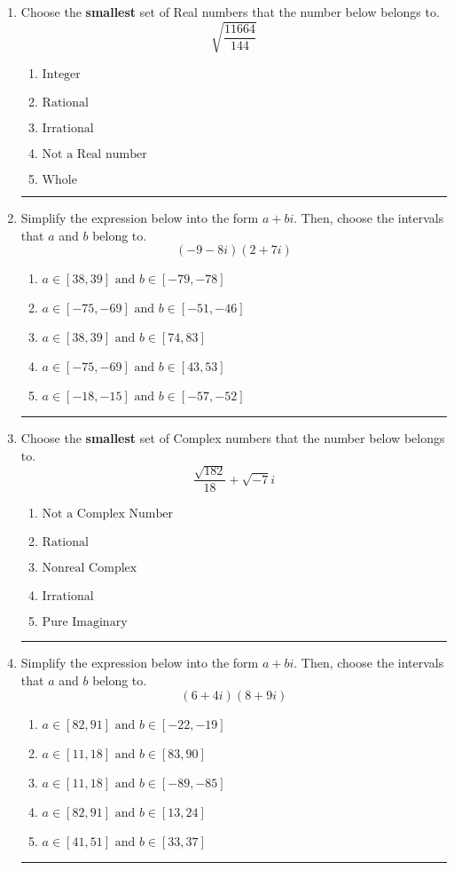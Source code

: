 \documentclass[14pt]{extbook}
\newcommand{\litem}[1]{\item#1\hspace*{-1cm}\rule{\textwidth}{0.4pt}}
\begin{document}
\begin{enumerate}
{\begin{enumerate}[label=\Alph*.]
\end{enumerate} }
\litem{
Choose the \textbf{smallest} set of Real numbers that the number below belongs to.\[ \sqrt{\frac{11664}{144}} \]\begin{enumerate}[label=\Alph*.]
\item \( \text{Integer} \)
\item \( \text{Rational} \)
\item \( \text{Irrational} \)
\item \( \text{Not a Real number} \)
\item \( \text{Whole} \)

\end{enumerate} }
\litem{
Simplify the expression below into the form $a+bi$. Then, choose the intervals that $a$ and $b$ belong to.\[ (-9 - 8 i)(2 + 7 i) \]\begin{enumerate}[label=\Alph*.]
\item \( a \in [38, 39] \text{ and } b \in [-79, -78] \)
\item \( a \in [-75, -69] \text{ and } b \in [-51, -46] \)
\item \( a \in [38, 39] \text{ and } b \in [74, 83] \)
\item \( a \in [-75, -69] \text{ and } b \in [43, 53] \)
\item \( a \in [-18, -15] \text{ and } b \in [-57, -52] \)

\end{enumerate} }
\litem{
Choose the \textbf{smallest} set of Complex numbers that the number below belongs to.\[ \frac{\sqrt{182}}{18}+\sqrt{-7}i \]\begin{enumerate}[label=\Alph*.]
\item \( \text{Not a Complex Number} \)
\item \( \text{Rational} \)
\item \( \text{Nonreal Complex} \)
\item \( \text{Irrational} \)
\item \( \text{Pure Imaginary} \)

\end{enumerate} }
\litem{
Simplify the expression below into the form $a+bi$. Then, choose the intervals that $a$ and $b$ belong to.\[ (6 + 4 i)(8 + 9 i) \]\begin{enumerate}[label=\Alph*.]
\item \( a \in [82, 91] \text{ and } b \in [-22, -19] \)
\item \( a \in [11, 18] \text{ and } b \in [83, 90] \)
\item \( a \in [11, 18] \text{ and } b \in [-89, -85] \)
\item \( a \in [82, 91] \text{ and } b \in [13, 24] \)
\item \( a \in [41, 51] \text{ and } b \in [33, 37] \)


\end{enumerate}}
\end{enumerate}
\end{document}
